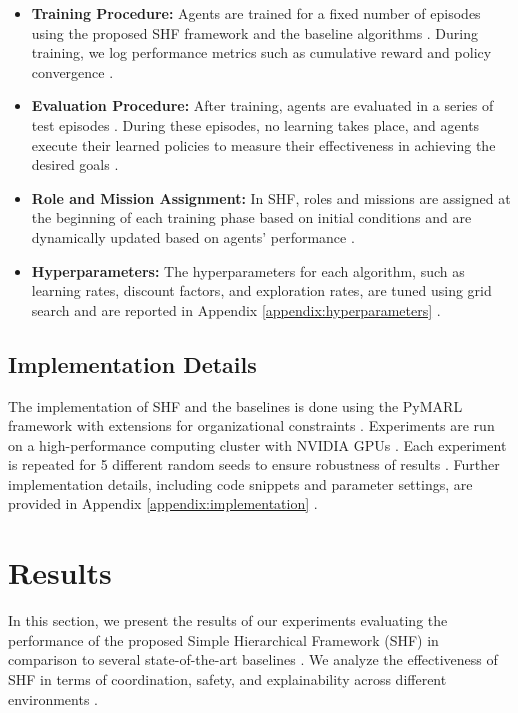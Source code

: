 \documentclass[sigconf,anonymous]{aamas}
\begin{document}
\begin{itemize}
    \item \textbf{Training Procedure:} Agents are trained for a fixed number of episodes using the proposed SHF framework and the baseline algorithms \cite{hubner2010moise, foerster2018counterfactual}. During training, we log performance metrics such as cumulative reward and policy convergence \cite{lowe2017multi}.
    \item \textbf{Evaluation Procedure:} After training, agents are evaluated in a series of test episodes \cite{foerster2016learning}. During these episodes, no learning takes place, and agents execute their learned policies to measure their effectiveness in achieving the desired goals \cite{lowe2017multi}.
    \item \textbf{Role and Mission Assignment:} In SHF, roles and missions are assigned at the beginning of each training phase based on initial conditions and are dynamically updated based on agents' performance \cite{hubner2010moise, soule2024}.
    \item \textbf{Hyperparameters:} The hyperparameters for each algorithm, such as learning rates, discount factors, and exploration rates, are tuned using grid search and are reported in Appendix \ref{appendix:hyperparameters} \cite{lowe2017multi, foerster2018counterfactual}.
\end{itemize}

\subsection{Implementation Details}
The implementation of SHF and the baselines is done using the PyMARL framework \cite{pymarl_reference} with extensions for organizational constraints \cite{foerster2018counterfactual}. Experiments are run on a high-performance computing cluster with NVIDIA GPUs \cite{wei2019safe}. Each experiment is repeated for 5 different random seeds to ensure robustness of results \cite{foerster2016learning}. Further implementation details, including code snippets and parameter settings, are provided in Appendix \ref{appendix:implementation} \cite{hubner2010moise}.

\section{Results}
In this section, we present the results of our experiments evaluating the performance of the proposed Simple Hierarchical Framework (SHF) in comparison to several state-of-the-art baselines \cite{foerster2018counterfactual}. We analyze the effectiveness of SHF in terms of coordination, safety, and explainability across different environments \cite{wei2019safe, soule2024}.
\end{document}
